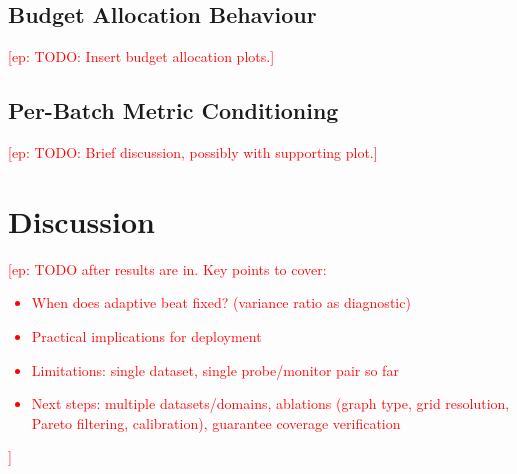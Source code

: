 \documentclass{article}
\newcommand{\edoardo}[1]{\textcolor{red}{[ep: #1]}}
\begin{document}
\subsection{Budget Allocation Behaviour}

\edoardo{TODO: Insert budget allocation plots.}


\subsection{Per-Batch Metric Conditioning}

\edoardo{TODO: Brief discussion, possibly with supporting plot.}


\section{Discussion}
\label{sec:discussion}

\edoardo{TODO after results are in. Key points to cover:
\begin{itemize}
    \item When does adaptive beat fixed? (variance ratio as diagnostic)
    \item Practical implications for deployment
    \item Limitations: single dataset, single probe/monitor pair so far
    \item Next steps: multiple datasets/domains, ablations (graph type, grid resolution, Pareto filtering, calibration), guarantee coverage verification
\end{itemize}
}




\end{document}
